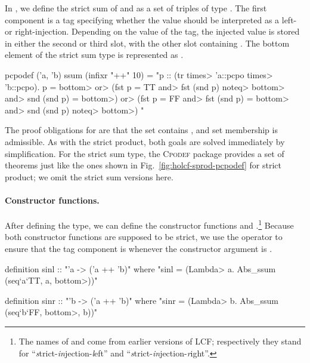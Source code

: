 In , we define the strict sum of  and  as a set of triples of type . The first component is a tag specifying whether the value should be interpreted as a left- or right-injection. Depending on the value of the tag, the injected value is stored in either the second or third slot, with the other slot containing . The bottom element of the strict sum type is represented as .

\begin{isacode}
pcpodef ('a, 'b) ssum (infixr "++" 10) = 
  "{p :: (tr \<times> 'a::pcpo \<times> 'b::pcpo). p = \<bottom> \<or>
      (fst p = TT \<and> fst (snd p) \<noteq> \<bottom> \<and> snd (snd p) = \<bottom>) \<or>
      (fst p = FF \<and> fst (snd p) = \<bottom> \<and> snd (snd p) \<noteq> \<bottom>) }"
\end{isacode}

\noindent
The proof obligations for  are that the set contains , and set membership is admissible. As with the strict product, both goals are solved immediately by simplification. For the strict sum type, the \textsc{Cpodef} package provides a set of theorems just like the ones shown in Fig.~\ref{fig:holcf-sprod-pcpodef} for strict product; we omit the strict sum versions here.

\paragraph{Constructor functions.} After defining the type, we can define the constructor functions  and .\footnote{The names of  and  come from earlier versions of LCF; respectively they stand for ``\emph{s}trict-\emph{in}jection-\emph{l}eft'' and ``\emph{s}trict-\emph{in}jection-\emph{r}ight''.} Because both constructor functions are supposed to be strict, we use the  operator to ensure that the tag component is  whenever the constructor argument is .

\begin{isacode}
definition sinl :: "'a -> ('a ++ 'b)"
  where "sinl = (\<Lambda> a. Abs_ssum (seq`a`TT, a, \<bottom>))"
\end{isacode}
\unmedskip
{}
\begin{isacode}
definition sinr :: "'b -> ('a ++ 'b)"
  where "sinr = (\<Lambda> b. Abs_ssum (seq`b`FF, \<bottom>, b))"
\end{isacode}

